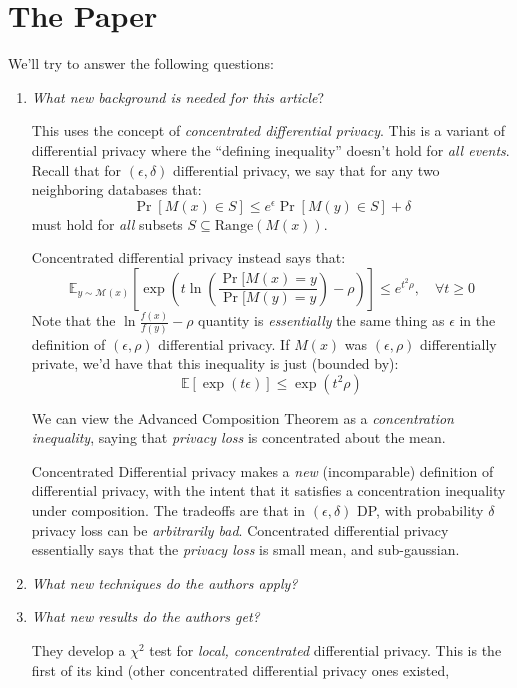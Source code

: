 \documentclass{article}
\begin{document}
\section{The Paper}
We'll try to answer the following questions:
\begin{enumerate}
\item \emph{What new background is needed for this article}?

This uses the concept of \emph{concentrated differential privacy}.
This is a variant of differential privacy where the ``defining inequality'' doesn't hold for \emph{all events}.
Recall that for $(\epsilon,\delta)$ differential privacy, we say that for any two neighboring databases that:
\begin{equation}
\Pr[M(x) \in S]\leq e^{\epsilon}\Pr[M(y)\in S] + \delta
\end{equation}
must hold for \emph{all} subsets $S\subseteq\text{Range}(M(x))$.

Concentrated differential privacy instead says that:
\begin{equation}
\mathbb{E}_{y\sim\mathcal{M}(x)}[\exp(t\ln(\frac{\Pr[M(x) = y}{\Pr[M(y) = y}) - \rho)]\leq e^{t^2\rho},\quad \forall t\geq 0
\end{equation}
Note that the $\ln\frac{f(x)}{f(y)} - \rho$ quantity is \emph{essentially} the same thing as $\epsilon$ in the definition of $(\epsilon,\rho)$ differential privacy.
If $M(x)$ was $(\epsilon,\rho)$ differentially private, we'd have that this inequality is just (bounded by):
\begin{equation}
\mathbb{E}[\exp(t\epsilon)] \leq \exp(t^2\rho)
\end{equation}

We can view the Advanced Composition Theorem as a \emph{concentration inequality}, saying that \emph{privacy loss} is concentrated about the mean.

Concentrated Differential privacy makes a \emph{new} (incomparable) definition of differential privacy, with the intent that it satisfies a concentration inequality under composition.
The tradeoffs are that in $(\epsilon,\delta)$ DP, with probability $\delta$ privacy loss can be \emph{arbitrarily bad}.
Concentrated differential privacy essentially says that the \emph{privacy loss} is small mean, and sub-gaussian.


\item \emph{What new techniques do the authors apply?}


\item \emph{What new results do the authors get?}

They develop a $\chi^2$ test for \emph{local, concentrated} differential privacy.
This is the first of its kind (other concentrated differential privacy ones existed, 

\end{enumerate}
\end{document}
